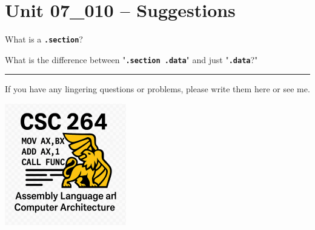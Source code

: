 \documentclass[letterpaper,12pt]{exam}
\newcommand{\unit}{Unit 07}
\begin{document}

\section*{\unit\_010 -- Suggestions}
\par{\selectfont\textbf{}}
\begin{questions}

\begin{samepage}
    \question What is a \texttt{\textbf{.section}}?
    \vspace{5mm}
\end{samepage}
\begin{samepage}
    \question What is the difference between "\texttt{\textbf{.section .data}}" and just "\texttt{\textbf{.data}}?"
    \vspace{5mm}
\end{samepage}
\par
 





\end{questions} 
\begin{center}
    \rule{0.667\textwidth}{.8pt} %
\end{center}


If you have any lingering questions or problems, please write them here or see me.
\vfill
\begin{center}
\includegraphics{../csc264Logo}
\end{center}
\end{document}
